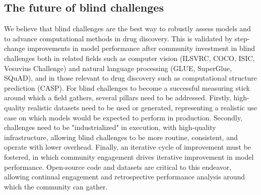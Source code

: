 \documentclass[journal=jcim,manuscript=article]{achemso}
\begin{document}


\subsection{The future of blind challenges}

We believe that blind challenges are the best way to robustly assess models and to advance computational methods in drug discovery. This is validated by step-change improvements in model performance after community investment in blind challenges both in related fields such as computer vision (ILSVRC\cite{ILSVRC15}, COCO\cite{coco}, ISIC\cite{tschandl_humancomputer_2020}, Vesuvius Challenge\cite{vesuvius}) and natural language processing (GLUE, SuperGlue,  SQuAD), and in those relevant to drug discovery such as computational structure prediction (CASP)\cite{casp13_2019, casp14_2021, casp15_2023}. For blind challenges to become a successful measuring stick around which a field gathers, several pillars need to be addressed. Firstly, high-quality realistic datasets need to be used or generated, representing a realistic use case on which models would be expected to perform in production. Secondly, challenges need to be "industrialized" in execution, with high-quality infrastructure, allowing blind challenges to be more routine, consistent, and operate with lower overhead. Finally, an iterative cycle of improvement must be fostered, in which community engagement drives iterative improvement in model performance. Open-source code and datasets are critical to this endeavor, allowing continual engagement and retrospective performance analysis around which the community can gather. 
\end{document}
